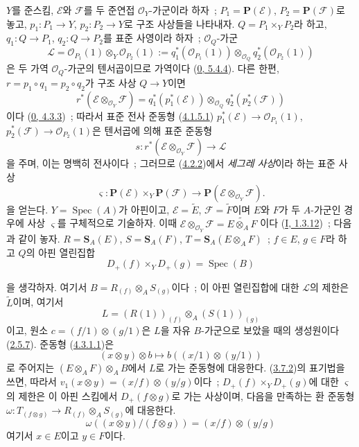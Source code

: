 \begin{env}[4.3.1]
\label{II.4.3.1-ko}
$Y$를 준스킴, $\mathcal{E}$와 $\mathcal{F}$를 두 준연접
$\mathcal{O}_Y$-가군이라 하자~; $P_1=\mathbf{P}(\mathcal{E})$,
$P_2=\mathbf{P}(\mathcal{F})$로 놓고,
$p_1:P_1\to Y$, $p_2:P_2\to Y$로 구조 사상들을 나타내자.
$Q=P_1\times_YP_2$라 하고, $q_1:Q\to P_1$, $q_2:Q\to P_2$를
표준 사영이라 하자~; $\mathcal{O}_Q$-가군
\[
  \mathcal{L}=\mathcal{O}_{P_1}(1)\otimes_Y\mathcal{O}_{P_2}(1)
  :=q_1^*(\mathcal{O}_{P_1}(1))\otimes_{\mathcal{O}_Q}
  q_2^*(\mathcal{O}_{P_2}(1))
\]
은 두 가역 $\mathcal{O}_Q$-가군의 텐서곱이므로 가역이다
(\hyperref[0.5.4.4-ko]{0, 5.4.4}). 다른 한편,
$r=p_1\circ q_1=p_2\circ q_2$가 구조 사상 $Q\to Y$이면
\[
  r^*(\mathcal{E}\otimes_{\mathcal{O}_Y}\mathcal{F})
  =q_1^*(p_1^*(\mathcal{E}))\otimes_{\mathcal{O}_Q}
  q_2^*(p_2^*(\mathcal{F}))
\]
이다 (\hyperref[0.4.3.3-ko]{0, 4.3.3})~; 따라서 표준 전사 준동형
(\hyperref[II.4.1.5.1-ko]{4.1.5.1})
$p_1^*(\mathcal{E})\to\mathcal{O}_{P_1}(1)$,
$p_2^*(\mathcal{F})\to\mathcal{O}_{P_2}(1)$은 텐서곱에 의해 표준 준동형
\[
\label{II.4.3.1.1-ko}
  s:r^*(\mathcal{E}\otimes_{\mathcal{O}_Y}\mathcal{F})\longrightarrow
  \mathcal{L}
\tag{4.3.1.1}
\]
을 주며, 이는 명백히 전사이다~; 그러므로
(\hyperref[II.4.2.2-ko]{4.2.2})에서 \emph{세그레 사상}이라 하는 표준 사상
\[
\label{II.4.3.1.2-ko}
  \varsigma:\mathbf{P}(\mathcal{E})\times_Y\mathbf{P}(\mathcal{F})
  \longrightarrow
  \mathbf{P}(\mathcal{E}\otimes_{\mathcal{O}_Y}\mathcal{F}).
\tag{4.3.1.2}
\]
을 얻는다.
$Y=\operatorname{Spec}(A)$가 아핀이고,
$\mathcal{E}=\widetilde{E}$, $\mathcal{F}=\widetilde{F}$이며 $E$와 $F$가
두 $A$-가군인 경우에 사상 $\varsigma$를 구체적으로 기술하자. 이때
$\mathcal{E}\otimes_{\mathcal{O}_Y}\mathcal{F}=\widetilde{E\otimes_A F}$
이다 (\hyperref[I.1.3.12-ko]{I, 1.3.12})~; 다음과 같이 놓자.
$R=\mathbf{S}_A(E)$, $S=\mathbf{S}_A(F)$,
$T=\mathbf{S}_A(E\otimes_A F)$~; $f\in E$, $g\in F$라 하고 $Q$의
아핀 열린집합
\[
  D_+(f)\times_YD_+(g)=\operatorname{Spec}(B)
\]


을 생각하자. 여기서 $B=R_{(f)}\otimes_AS_{(g)}$이다~; 이 아핀
열린집합에 대한 $\mathcal{L}$의 제한은 $\widetilde{L}$이며, 여기서
\[
  L=(R(1))_{(f)}\otimes_A(S(1))_{(g)}
\]
이고, 원소 $c=(f/1)\otimes(g/1)$은 $L$을 자유 $B$-가군으로 보았을
때의 생성원이다 (\hyperref[II.2.5.7-ko]{2.5.7}). 준동형
(\hyperref[II.4.3.1.1-ko]{4.3.1.1})은
\[
  (x\otimes y)\otimes b\longmapsto b((x/1)\otimes(y/1))
\]
로 주어지는 $(E\otimes_A F)\otimes_AB$에서 $L$로 가는 준동형에
대응한다. (\hyperref[II.3.7.2-ko]{3.7.2})의 표기법을 쓰면, 따라서
$v_1(x\otimes y)=(x/f)\otimes(y/g)$이다~; $D_+(f)\times_YD_+(g)$에
대한 $\varsigma$의 제한은 이 아핀 스킴에서 $D_+(f\otimes g)$로 가는
사상이며, 다음을 만족하는 환 준동형
$\omega:T_{(f\otimes g)}\to R_{(f)}\otimes_AS_{(g)}$에 대응한다.
\[
\label{II.4.3.1.3-ko}
  \omega((x\otimes y)/(f\otimes g))=(x/f)\otimes(y/g)
\tag{4.3.1.3}
\]
여기서 $x\in E$이고 $y\in F$이다.
\end{env}

